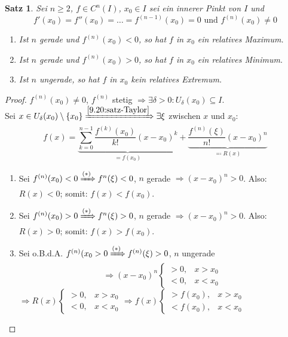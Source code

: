 \documentclass[12pt]{extreport} %
\theoremstyle{named}
\theoremstyle{dotless}
\newtheorem{satz}[unnamedtheorem]{Satz}
\begin{document}
\begin{satz} \label{9.21:satz}
	Sei $n \geq 2$, $f \in C^{n}(I)$, $x_{0} \in I$ sei ein innerer Pinkt von $I$ und
	$$ f'(x_{0}) = f''(x_{0}) = \dotsc = f^{(n-1)}(x_{0}) = 0 \text{ und } f^{(n)}(x_{0}) \neq 0 $$
	\begin{enumerate}
		\item Ist $n$ gerade und $f^{(n)}(x_{0}) < 0$, so hat $f$ in $x_{0}$ ein relatives Maximum.
		\item Ist $n$ gerade und $f^{(n)}(x_{0}) > 0$, so hat $f$ in $x_{0}$ ein relatives Minimum.
		\item Ist $n$ ungerade, so hat $f$ in $x_{0}$ kein relatives Extremum. 
	\end{enumerate}	
\end{satz}

\begin{proof}
	$f^{(n)}(x_{0}) \neq 0$, $f^{(n)}$ stetig $\Rightarrow \exists \delta > 0: U_{\delta}(x_{0}) \subseteq I$. \\
	Sei $x \in U_{\delta}(x_{0}) \setminus \{ x_{0} \} \xRightarrow[]{\ref{9.20:satz-Taylor}} \exists \xi$ zwischen $x$ und $x_{0}$:
	$$ f(x) = \underbrace{\sum_{k=0}^{n-1} \frac{f^{(k)}(x_{0})}{k!} (x - x_{0})^{k}}_{= f(x_{0})} + \underbrace{\frac{f^{(n)}(\xi)}{n!} (x - x_{0})^{n}}_{\eqqcolon R(x)} $$
	\begin{enumerate}
		\item Sei $f^{(n)}(x_{0}) < 0 \xRightarrow[]{(*)} f^{n}(\xi) < 0$, $n$ gerade $\Rightarrow (x - x_{0})^{n} > 0$. Also: $R(x) < 0$; somit: $f(x) < f(x_{0})$.
		\item Sei $f^{(n)}(x_{0}) > 0 \xRightarrow[]{(*)} f^{n}(\xi) > 0$, $n$ gerade $\Rightarrow (x - x_{0})^{n} > 0$. Also: $R(x) > 0$; somit: $f(x) > f(x_{0})$.
		\item Sei o.B.d.A. $f^{(n)}(x_{0} > 0 \xRightarrow[]{(*)} f^{(n)}(\xi) > 0$, $n$ ungerade
			$$ \Rightarrow (x - x_{0})^{n} \begin{cases} > 0, & x > x_{0} \\ < 0, & x < x_{0} \end{cases} $$
			$\Rightarrow R(x) \begin{cases} > 0, & x > x_{0} \\ < 0, & x < x_{0} \end{cases} \Rightarrow f(x) \begin{cases} > f(x_{0}), & x > x_{0} \\ < f(x_{0}), & x < x_{0} \end{cases}$
			
	\end{enumerate}
\end{proof}
\end{document}
